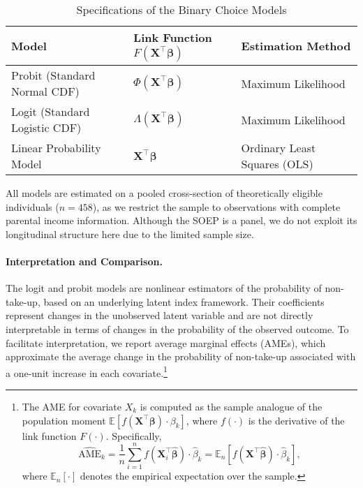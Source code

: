 \begin{table}[H]
\footnotesize
\centering
\label{tab:model_specifications}
\begin{tabular}{@{}lll@{}}
\toprule
\textbf{Model} & \textbf{Link Function \( F(\mathbf{X}^\top \boldsymbol{\beta}) \)} & \textbf{Estimation Method} \\ \midrule
Probit (Standard Normal CDF) & \( \Phi(\mathbf{X}^\top \boldsymbol{\beta}) \) & Maximum Likelihood \\
Logit (Standard Logistic CDF) & \( \Lambda(\mathbf{X}^\top \boldsymbol{\beta}) \) & Maximum Likelihood \\
Linear Probability Model & \( \mathbf{X}^\top \boldsymbol{\beta} \) & Ordinary Least Squares (OLS) \\
\bottomrule
\end{tabular}
\caption{Specifications of the Binary Choice Models}
\end{table}

All models are estimated on a pooled cross-section of theoretically eligible individuals (\( n = 458 \)), as we restrict the sample to observations with complete parental income information. 
Although the SOEP is a panel, we do not exploit its longitudinal structure here due to the limited sample size.

\paragraph{Interpretation and Comparison.} 
The logit and probit models are nonlinear estimators of the probability of non-take-up, based on an underlying latent index framework. 
Their coefficients represent changes in the unobserved latent variable and are not directly interpretable in terms of changes in the probability of the observed outcome. 
To facilitate interpretation, we report average marginal effects (AMEs), which approximate the average change in the probability of non-take-up associated with a one-unit increase in each covariate.\footnote{The AME for covariate \( X_k \) is computed as the sample analogue of the population moment \( \mathbb{E}[f(\mathbf{X}^\top \boldsymbol{\beta}) \cdot \beta_k] \), where \( f(\cdot) \) is the derivative of the link function \( F(\cdot) \). Specifically,
\[
    \widehat{\text{AME}}_k 
    = \frac{1}{n} \sum_{i=1}^n f(\mathbf{X}_i^\top \hat{\boldsymbol{\beta}}) \cdot \hat{\beta}_k
    = \mathbb{E}_n \left[ f(\mathbf{X}^\top \hat{\boldsymbol{\beta}}) \cdot \hat{\beta}_k \right],
\]
where \( \mathbb{E}_n[\cdot] \) denotes the empirical expectation over the sample.}

